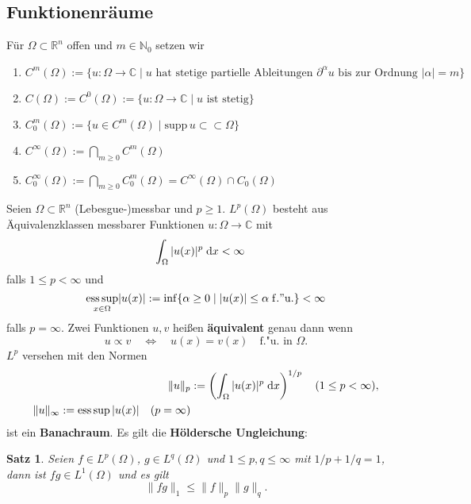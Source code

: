 \documentclass[
paper=a4,
bibtotocnumbered,
liststotocnumbered,
tablecaptionabove,
pointlessnumbers,
twoside,
openright,
10pt
]
{report}
\newcommand{\supp}{\mathrm{supp}\,}
\DeclareMathOperator{\ess}{ess\,sup}
\newtheorem*{satzn}{Satz}
\theoremstyle{definition}
\numberwithin{equation}{chapter}
\begin{document}
\subsection*{Funktionenräume}
Für $\Omega\subset\mathbb{R}^n$ offen und $m\in\mathbb{N}_0$ setzen wir
\begin{enumerate}[\quad\color{dblue}$\blacktriangleright$]
\item $C^m(\Omega):=\{u:\Omega\rightarrow\mathbb{C}\mid u\text{ hat stetige partielle Ableitungen }\partial^\alpha u\text{ bis zur Ordnung }|\alpha|=m\}$
\item $C(\Omega):= C^0(\Omega):=\{u:\Omega\rightarrow\mathbb{C}\mid u\text{ ist stetig}\}$
\item $C_0^m(\Omega):=\{u\in C^m(\Omega)\mid \supp u\subset\subset\Omega\}$
\item $C^\infty(\Omega):=\bigcap_{m\geq 0} C^m(\Omega)$
\item $C_0^\infty(\Omega):=\bigcap_{m\geq 0} C_0^m(\Omega)=C^\infty(\Omega)\cap C_0(\Omega)$
\end{enumerate}
Seien $\Omega\subset\mathbb{R}^n$ (Lebesgue-)messbar und $p\geq 1$. $L^p(\Omega)$ besteht aus Äquivalenzklassen messbarer Funktionen $u:\Omega\rightarrow\mathbb{C}$ mit
\begin{equation}
\int_\Omega |u(x)|^p\;\mathrm{d} x<\infty\quad
\end{equation}
falls $1\leq p<\infty$ und
\begin{equation}
\underset{x\in\Omega}{\ess} |u(x)|:= \inf\{\alpha\geq 0\mid  |u(x)|\leq\alpha\;\mathrm{f."u.}\}<\infty
\end{equation}
falls $p=\infty$. Zwei Funktionen $u,v$ heißen \textbf{äquivalent} genau dann wenn
\begin{equation}
u\propto v\quad\Leftrightarrow\quad u(x)=v(x)\quad\text{f."u. in }\Omega.
\end{equation}
$L^p$ versehen mit den Normen
\begin{align}
\|u\|_p&:=\left(\int_\Omega |u(x)|^p\d x\right)^{1/p}\quad (1\leq p<\infty), \\
\|u\|_\infty:=\ess |u(x)|\quad(p=\infty)
\end{align}
ist ein \textbf{Banachraum}. Es gilt die \textbf{Höldersche Ungleichung}:
\begin{satzn}
Seien $f\in L^p(\Omega)$, $g\in L^q(\Omega)$ und $1\leq p,q\leq\infty$ mit $1/p+1/q=1$, dann ist $fg\in L^1(\Omega)$ und es gilt
\begin{equation}
\|fg\|_1\leq \|f\|_p\|g\|_q.
\end{equation}
\end{satzn}
\end{document}
